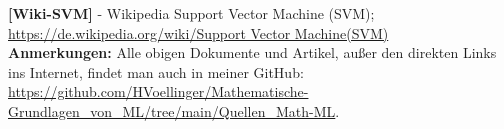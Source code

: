 \documentclass[12pt]{article}
\begin{document}
%
\textbf{[Wiki-SVM]} - Wikipedia Support Vector Machine (SVM); \url{https://de.wikipedia.org/wiki/Support Vector Machine(SVM)} \\[0.2cm] 
%
\textbf{Anmerkungen:} Alle obigen Dokumente und Artikel, außer den direkten Links ins Internet, findet man auch in meiner GitHub: \url{https://github.com/HVoellinger/Mathematische-Grundlagen_von_ML/tree/main/Quellen_Math-ML}.\\[0.2cm]  
%
%
%

{\color{blue}{\printindex}}
\end{document}
